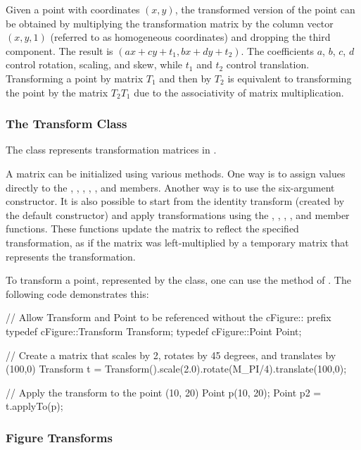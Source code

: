 Given a point with coordinates $(x, y)$, the transformed version of the point
can be obtained by multiplying the transformation matrix by the column vector
$(x, y, 1)$ (referred to as homogeneous coordinates) and dropping the third
component. The result is $(ax + cy + t_1, bx + dy + t_2)$. The coefficients $a$,
$b$, $c$, $d$ control rotation, scaling, and skew, while $t_1$ and $t_2$ control
translation. Transforming a point by matrix $T_1$ and then by $T_2$ is
equivalent to transforming the point by the matrix $T_2 T_1$ due to the
associativity of matrix multiplication.


\subsubsection{The Transform Class}
\label{sec:graphics:the-transform-class}

The  class represents transformation matrices in {\opp}.

A  matrix can be initialized using various methods.
One way is to assign values directly to the , , , ,
, and  members. Another way is to use the six-argument
constructor. It is also possible to start from the identity transform (created
by the default constructor) and apply transformations using the ,
, , , and 
member functions. These functions update the matrix to reflect the specified
transformation, as if the matrix was left-multiplied by a temporary matrix that
represents the transformation.

To transform a point, represented by the  class, one can
use the  method of . The following
code demonstrates this:

\begin{cpp}
// Allow Transform and Point to be referenced without the cFigure:: prefix
typedef cFigure::Transform Transform;
typedef cFigure::Point Point;

// Create a matrix that scales by 2, rotates by 45 degrees, and translates by (100,0)
Transform t = Transform().scale(2.0).rotate(M_PI/4).translate(100,0);

// Apply the transform to the point (10, 20)
Point p(10, 20);
Point p2 = t.applyTo(p);
\end{cpp}


\subsubsection{Figure Transforms}
\label{sec:graphics:figure-transforms}

